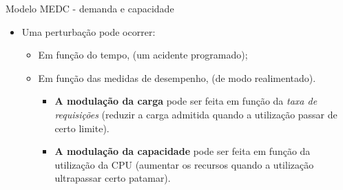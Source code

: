 \begin{frame}{Modelo MEDC - demanda e capacidade}
	\begin{itemize}
		\item Uma perturbação pode ocorrer:
		\begin{itemize}
			\item Em função do tempo, (um acidente programado);
			\item Em função das medidas de desempenho, (de modo realimentado).
		
				\begin{itemize}
					\item \textbf{A modulação da carga} pode ser feita em função da \textit{taxa de requisições} (reduzir a carga admitida quando a utilização passar de certo limite).  
					\item \textbf{A modulação da capacidade} pode ser feita em função da utilização da CPU (aumentar os recursos quando a utilização ultrapassar certo patamar).  
				\end{itemize} 
		\end{itemize} 
	\end{itemize}
\end{frame}

%		
%		



